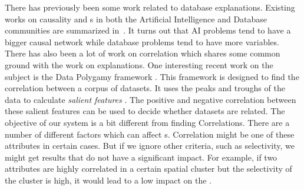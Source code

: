 There has previously been some work related to database explanations. 
Existing works on causality and {\explanation}s in both the Artificial Intelligence and Database communities are summarized in~\cite{meliou2014causality}. It turns out that AI problems tend to have a bigger causal network while database problems tend to have more variables.
There has also been a lot of work on correlation which shares some common ground with the work on explanations. One interesting recent work on the subject is the Data Polygamy framework \cite{chirigati2016data}. This framework is designed to find the correlation between a corpus of datasets. It uses the peaks and troughs of the data to calculate \textit{salient features} \cite{dunn1986applied}. The positive and negative correlation between these salient features can be used to decide whether datasets are related\cite{su2014supporting}. The objective of our system is a bit different from finding Correlations. There are a number of different factors which can affect {\fact}s. Correlation might be one of these attributes in certain cases. But if we ignore other criteria, such as selectivity, we might get results that do not have a significant impact. For example, if two attributes are highly correlated in a certain spatial cluster but the selectivity of the cluster is high, it would lead to a low impact on the {\fact}.






